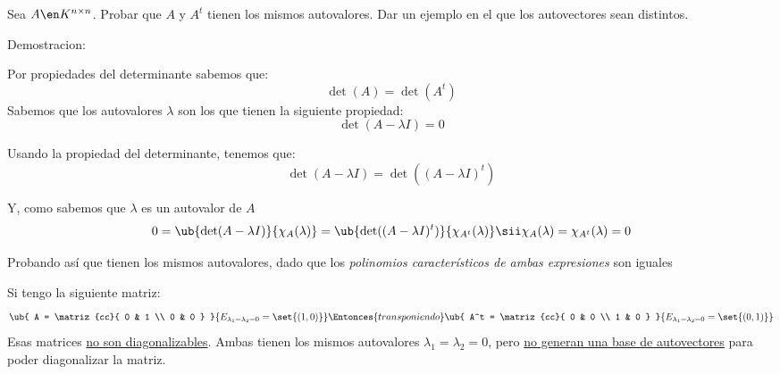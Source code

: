 \begin{enunciado}{\ejercicio}
  Sea $A \en K^{n \times n}$. Probar que $A$ y $A^t$ tienen los mismos autovalores. Dar un ejemplo en el
  que los autovectores sean distintos.
\end{enunciado}

Demostracion:

Por propiedades del determinante sabemos que:
$$
  \det(A) = \det(A^t)
$$
Sabemos que los autovalores $\lambda$ son los que tienen la siguiente propiedad:
$$
  \det(A - \lambda I) = 0
$$

Usando la propiedad del determinante, tenemos que:
$$
  \det(A - \lambda I) = \det((A - \lambda I)^t)
$$

Y, como sabemos que $\lambda$ es un autovalor de $A$
$$
  0 =
  \ub{
    \det(A - \lambda I)
  }{\chi_A(\lambda)} =
  \ub{
    \det((A - \lambda I)^t)
  }{\chi_{A^t}(\lambda)}
  \sii
  \chi_A(\lambda) = \chi_{A^t}(\lambda) = 0
$$

Probando así que tienen los mismos autovalores, dado que los \textit{polinomios característicos de ambas expresiones} son iguales

Si tengo la siguiente matriz:
$$
  \ub{
    A =
    \matriz{cc}{
      0 & 1 \\
      0 & 0
    }
  }{
    E_{\lambda_1 = \lambda_2 = 0} = \set{(1,0)}
  }
  \Entonces{transponiendo}
  \ub{
    A^t =
    \matriz{cc}{
      0 & 0 \\
      1 & 0
    }
  }{
    E_{\lambda_1 = \lambda_2 = 0} = \set{(0,1)}
  }
$$
Esas matrices \underline{no son diagonalizables}. Ambas tienen los mismos autovalores $\lambda_1 = \lambda_2 = 0$,
pero \underline{no generan una base de autovectores} para poder diagonalizar la matriz.

\begin{aportes}
  \item {}
  \item {}
\end{aportes}

